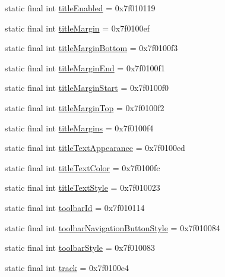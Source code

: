 \begin{CompactItemize}
static final int \hyperlink{classandroid_1_1support_1_1transition_1_1_r_1_1attr_78d6fcf0c1fef2a0da5156a75d53946f}{titleEnabled} = 0x7f010119
\item 
static final int \hyperlink{classandroid_1_1support_1_1transition_1_1_r_1_1attr_61cc59eeca6ceac10e469a22d48de170}{titleMargin} = 0x7f0100ef
\item 
static final int \hyperlink{classandroid_1_1support_1_1transition_1_1_r_1_1attr_86bc405218944b677631af0ca84a65b2}{titleMarginBottom} = 0x7f0100f3
\item 
static final int \hyperlink{classandroid_1_1support_1_1transition_1_1_r_1_1attr_b205b3ddc7a53f2316429925ca77dec6}{titleMarginEnd} = 0x7f0100f1
\item 
static final int \hyperlink{classandroid_1_1support_1_1transition_1_1_r_1_1attr_7457879ea25dff78d244e08797d9caef}{titleMarginStart} = 0x7f0100f0
\item 
static final int \hyperlink{classandroid_1_1support_1_1transition_1_1_r_1_1attr_82d2ad4bae23780166117bc604b4e88a}{titleMarginTop} = 0x7f0100f2
\item 
static final int \hyperlink{classandroid_1_1support_1_1transition_1_1_r_1_1attr_ecc940104bbff2018d1faecf2bd1b7aa}{titleMargins} = 0x7f0100f4
\item 
static final int \hyperlink{classandroid_1_1support_1_1transition_1_1_r_1_1attr_b95cc73fd613430199b731ca0c93e7a4}{titleTextAppearance} = 0x7f0100ed
\item 
static final int \hyperlink{classandroid_1_1support_1_1transition_1_1_r_1_1attr_a17b894ce30c1024e98da6073b6b8081}{titleTextColor} = 0x7f0100fc
\item 
static final int \hyperlink{classandroid_1_1support_1_1transition_1_1_r_1_1attr_a88644dfc964f670b65c6505d46246ce}{titleTextStyle} = 0x7f010023
\item 
static final int \hyperlink{classandroid_1_1support_1_1transition_1_1_r_1_1attr_d90d56a0c047654d5b27e87b02607a29}{toolbarId} = 0x7f010114
\item 
static final int \hyperlink{classandroid_1_1support_1_1transition_1_1_r_1_1attr_dbbf0a6934cab4ff2a114213073b147b}{toolbarNavigationButtonStyle} = 0x7f010084
\item 
static final int \hyperlink{classandroid_1_1support_1_1transition_1_1_r_1_1attr_c17c0e610924613622eb0aa15fd91219}{toolbarStyle} = 0x7f010083
\item 
static final int \hyperlink{classandroid_1_1support_1_1transition_1_1_r_1_1attr_ad6ec4a43cfe39ad618e8f367d0f9a66}{track} = 0x7f0100e4

\end{CompactItemize}
